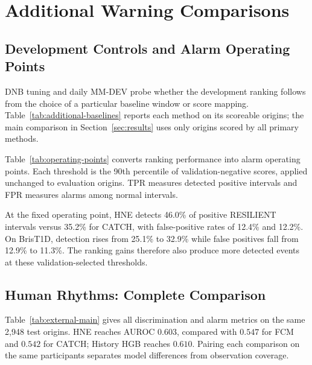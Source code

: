 \section{Additional Warning Comparisons}
\label{app:additional-results}

\subsection{Development Controls and Alarm Operating Points}
DNB tuning and daily MM-DEV probe whether the development ranking follows from the choice of a particular baseline window or score mapping. Table~\ref{tab:additional-baselines} reports each method on its scoreable origins; the main comparison in Section~\ref{sec:results} uses only origins scored by all primary methods.
\begin{table}[!htb]
\centering
\caption{Additional controls on their scored origins within the primary evaluation population.}
\label{tab:additional-baselines}
\end{table}

Table~\ref{tab:operating-points} converts ranking performance into alarm operating points. Each threshold is the 90th percentile of validation-negative scores, applied unchanged to evaluation origins. TPR measures detected positive intervals and FPR measures alarms among normal intervals.
\begin{table}[!htb]
\centering
\caption{Development operating points at validation-selected thresholds. FCM/CATCH here use individual-seed scores.}
\label{tab:operating-points}
\end{table}

At the fixed operating point, HNE detects 46.0\% of positive RESILIENT intervals versus 35.2\% for CATCH, with false-positive rates of 12.4\% and 12.2\%. On BrisT1D, detection rises from 25.1\% to 32.9\% while false positives fall from 12.9\% to 11.3\%. The ranking gains therefore also produce more detected events at these validation-selected thresholds.

\subsection{Human Rhythms: Complete Comparison}
Table~\ref{tab:external-main} gives all discrimination and alarm metrics on the same 2,948 test origins. HNE reaches AUROC $0.603$, compared with $0.547$ for FCM and $0.542$ for CATCH; History HGB reaches $0.610$. Pairing each comparison on the same participants separates model differences from observation coverage.
\begin{table}[!htb]
\centering
\caption{Human Rhythms on 2,948 common test origins. Neural methods average three seeds; TPR/FPR use validation-negative 90th-percentile thresholds.}
\label{tab:external-main}
\end{table}

